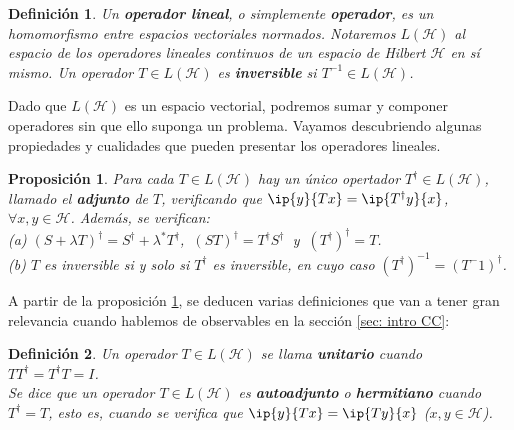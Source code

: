 \documentclass[11pt,a4paper,twoside,pdf]{article}
\numberwithin{equation}{section}
\newtheorem{definition}{Definición}
\newtheorem{proposition}{Proposición}
\begin{document}
	\begin{definition}
		Un \textbf{operador lineal}, o simplemente \textbf{operador}, es un homomorfismo entre espacios vectoriales normados. Notaremos $L(\mathcal{H})$ al espacio de los operadores lineales continuos de un espacio de Hilbert $\mathcal{H}$ en sí mismo.
		Un operador $T\in L(\mathcal{H})$ es \textbf{inversible} si $T^{-1}\in L(\mathcal{H})$.
	\end{definition}

	Dado que $L(\mathcal{H})$ es un espacio vectorial, podremos sumar y componer operadores sin que ello suponga un problema. Vayamos descubriendo algunas propiedades y cualidades que pueden presentar los operadores lineales.

	\begin{proposition} \label{prop: adjunto}
		Para cada $T\in L(\mathcal{H})$ hay un único opertador $T^\dagger \in L(\mathcal{H})$, llamado el \textbf{adjunto} de $T$, verificando que $\ip{y}{Tx}=\ip{T^\dagger y}{x}$, $\forall x, y \in \mathcal{H}$. Además, se verifican:\\
		\indent (a) $(S+\lambda T)^\dagger=S^\dagger+ \lambda^*T^\dagger $, $\: (ST)^\dagger=T^\dagger S^\dagger\:$ y $\:(T^\dagger)^\dagger=T$. \\
		\indent (b) $T$ es inversible si y solo si $T^\dagger$ es inversible, en cuyo caso $(T^\dagger)^{-1}=(T^-1)^\dagger$.
	\end{proposition}

	A partir de la proposición \ref{prop: adjunto}, se deducen varias definiciones que van a tener gran relevancia cuando hablemos de observables en la sección \ref{sec: intro CC}:
	
	\begin{definition}
		Un operador $T\in L(\mathcal{H})$ se llama \textbf{unitario} cuando $TT^\dagger=T^\dagger T =I$.\\
		Se dice que un operador $T\in L(\mathcal{H})$ es \textbf{autoadjunto} o \textbf{hermitiano} cuando $T^\dagger=T$, esto es, cuando se verifica que $\ip{y}{Tx}=\ip{Ty}{x}$ ($x,y\in\mathcal{H}$).
	\end{definition}
\end{document}
